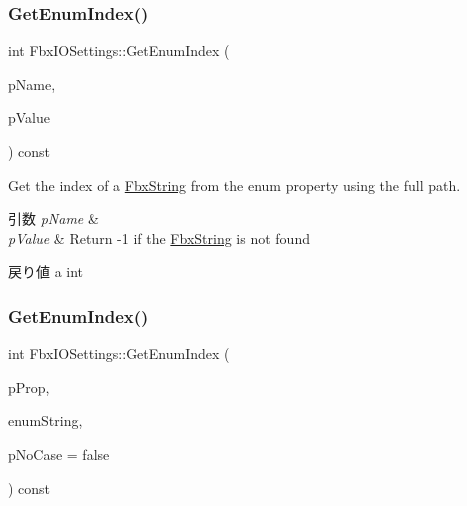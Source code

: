 \subsubsection{\texorpdfstring{Get\+Enum\+Index()}{GetEnumIndex()}\hspace{0.1cm}{\footnotesize\ttfamily [1/2]}}
{\footnotesize\ttfamily int Fbx\+I\+O\+Settings\+::\+Get\+Enum\+Index (\begin{DoxyParamCaption}\item[{const char $\ast$}]{p\+Name,  }\item[{\hyperlink{class_fbx_string}{Fbx\+String}}]{p\+Value }\end{DoxyParamCaption}) const}

Get the index of a \hyperlink{class_fbx_string}{Fbx\+String} from the enum property using the full path. 
\begin{DoxyParams}{引数}
{\em p\+Name} & \\
\hline
{\em p\+Value} & Return -\/1 if the \hyperlink{class_fbx_string}{Fbx\+String} is not found \\
\hline
\end{DoxyParams}
\begin{DoxyReturn}{戻り値}
a int 
\end{DoxyReturn}
\mbox{\label{class_fbx_i_o_settings_aef7ef50f0117516d9326b4b74e70f314}} 
\subsubsection{\texorpdfstring{Get\+Enum\+Index()}{GetEnumIndex()}\hspace{0.1cm}{\footnotesize\ttfamily [2/2]}}
{\footnotesize\ttfamily int Fbx\+I\+O\+Settings\+::\+Get\+Enum\+Index (\begin{DoxyParamCaption}\item[{\hyperlink{class_fbx_property}{Fbx\+Property} \&}]{p\+Prop,  }\item[{const \hyperlink{class_fbx_string}{Fbx\+String} \&}]{enum\+String,  }\item[{bool}]{p\+No\+Case = {\ttfamily false} }\end{DoxyParamCaption}) const}

